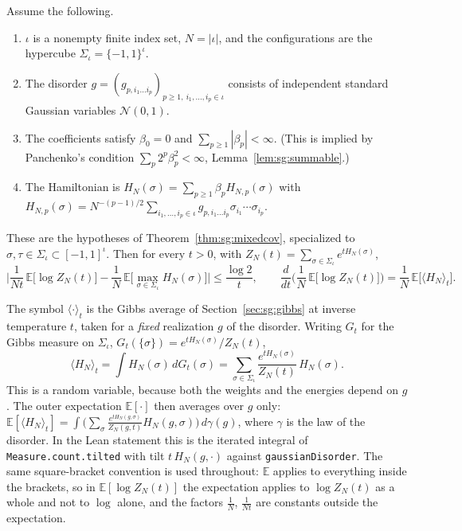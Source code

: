 \begin{theorem}\label{thm:sg:mixedfree}
  \leanok
Assume the following.
\begin{enumerate}
\item[(H1)] $\iota$ is a nonempty finite index set, $N=|\iota|$, and the configurations are the hypercube
  $\Sigma_\iota=\{-1,1\}^\iota$.
\item[(H2)] The disorder $g=(g_{p,i_1\dots i_p})_{p\ge1,\ i_1,\dots,i_p\in\iota}$ consists of independent standard
  Gaussian variables $\mathcal N(0,1)$.
\item[(H3)] The coefficients satisfy $\beta_0=0$ and $\sum_{p\ge1}|\beta_p|<\infty$. (This is implied by Panchenko's
  condition $\sum_p2^p\beta_p^2<\infty$, Lemma~\ref{lem:sg:summable}.)
\item[(H4)] The Hamiltonian is $H_N(\sigma)=\sum_{p\ge1}\beta_pH_{N,p}(\sigma)$ with
  $H_{N,p}(\sigma)=N^{-(p-1)/2}\sum_{i_1,\dots,i_p\in\iota}g_{p,i_1\dots i_p}\sigma_{i_1}\cdots\sigma_{i_p}$.
\end{enumerate}
These are the hypotheses of Theorem~\ref{thm:sg:mixedcov}, specialized to $\sigma,\tau\in\Sigma_\iota\subset[-1,1]^\iota$.
Then for every $t>0$, with $Z_N(t)=\sum_{\sigma\in\Sigma_\iota}e^{tH_N(\sigma)}$,
\[
\Big|\frac1{Nt}\,\mathbb E\big[\log Z_N(t)\big]-\frac1N\,\mathbb E\big[\max_{\sigma\in\Sigma_\iota}H_N(\sigma)\big]\Big|
\le\frac{\log2}{t},
\qquad
\frac{d}{dt}\Big(\frac1N\,\mathbb E\big[\log Z_N(t)\big]\Big)=\frac1N\,\mathbb E\big[\langle H_N\rangle_t\big].
\]
\end{theorem}

\begin{remark}
The symbol $\langle\cdot\rangle_t$ is the Gibbs average of Section~\ref{sec:sg:gibbs} at inverse temperature $t$, taken
for a \emph{fixed} realization $g$ of the disorder. Writing $G_t$ for the Gibbs measure on $\Sigma_\iota$,
$G_t(\{\sigma\})=e^{tH_N(\sigma)}/Z_N(t)$,
\[
\langle H_N\rangle_t=\int H_N(\sigma)\,dG_t(\sigma)=\sum_{\sigma\in\Sigma_\iota}\frac{e^{tH_N(\sigma)}}{Z_N(t)}\,H_N(\sigma).
\]
This is a random variable, because both the weights and the energies depend on $g$. The outer expectation
$\mathbb E[\cdot]$ then averages over $g$ only: $\mathbb E[\langle H_N\rangle_t]=\int\big(\sum_\sigma
\frac{e^{tH_N(g,\sigma)}}{Z_N(g,t)}H_N(g,\sigma)\big)\,d\gamma(g)$, where $\gamma$ is the law of the disorder. In
the Lean statement this is the iterated integral of \texttt{Measure.count.tilted} with tilt $t\,H_N(g,\cdot)$ against
\texttt{gaussianDisorder}. The same square-bracket convention is used throughout: $\mathbb E$ applies to everything
inside the brackets, so in $\mathbb E[\log Z_N(t)]$ the expectation applies to $\log Z_N(t)$ as a whole and not to $\log$ alone, and the factors $\frac1N$, $\frac1{Nt}$
are constants outside the expectation.
\end{remark}


